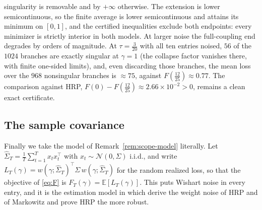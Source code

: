 \documentclass[11pt]{article}
\theoremstyle{remark}
\newcommand{\E}{\mathbb{E}}
\begin{document}
singularity is removable and by $+\infty$ otherwise. The extension is
lower semicontinuous, so the finite average is lower semicontinuous and
attains its minimum on $[0,1]$, and the certified
inequalities exclude both endpoints: every minimizer is strictly
interior in both models. At larger noise the full-coupling end degrades
by orders of magnitude. At $\tau = \tfrac{3}{20}$ with all ten entries
noised, $56$ of the $1024$ branches are exactly singular at
$\gamma = 1$ (the collapse factor vanishes there, with finite one-sided
limits), and, even discarding those branches, the mean loss over the
$968$ nonsingular branches is $\approx 75$,
against $F(\tfrac{12}{25}) \approx 0.77$. The comparison against HRP,
$F(0) - F(\tfrac{12}{25}) \approx 2.66 \times 10^{-2} > 0$, remains a
clean exact certificate.

\subsection{The sample covariance}
\label{sec:wishart}

Finally we take the model of Remark~\ref{rem:scope-model} literally. Let
$\widehat\Sigma_T = \tfrac{1}{T}\sum_{t=1}^{T} x_t x_t^\top$ with
$x_t \sim \mathcal{N}(0, \Sigma)$ i.i.d., and write
$L_T(\gamma) = w(\gamma; \widehat\Sigma_T)^\top \Sigma\,
w(\gamma; \widehat\Sigma_T)$ for the random realized loss, so that the
objective of \eqref{eq:F} is $F_T(\gamma) = \E[L_T(\gamma)]$. This puts
Wishart noise in every entry, and it is the estimation model in which
\cite{antonov2025} derive the weight noise of HRP and of Markowitz and
prove HRP the more robust.
\end{document}
